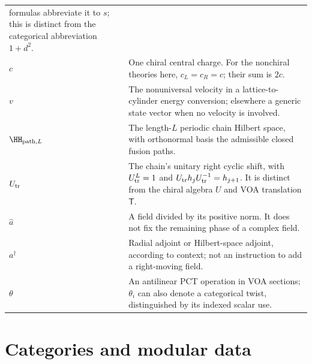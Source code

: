 \begin{longtable}{p{}p{}}
formulas abbreviate it to $s$; this is distinct from the
categorical abbreviation $1+d^2$.\\
$c$&One chiral central charge. For the nonchiral theories here,
$c_L=c_R=c$; their sum is $2c$.\\
$v$&The nonuniversal velocity in a lattice-to-cylinder energy
conversion; elsewhere a generic state vector when no velocity
is involved.\\
$\HH_{\mathrm{path},L}$&The length-$L$ periodic chain Hilbert
space, with orthonormal basis the admissible closed fusion paths.\\
$U_{\rm tr}$&The chain's unitary right cyclic shift, with
$U_{\rm tr}^L=1$ and $U_{\rm tr}h_jU_{\rm tr}^{-1}=h_{j+1}$.
It is distinct from the chiral algebra $U$ and VOA translation
$\mathsf T$.\\
$\widehat a$&A field divided by its positive norm. It does not
fix the remaining phase of a complex field.\\
$a^\dagger$&Radial adjoint or Hilbert-space adjoint, according
to context; not an instruction to add a right-moving field.\\
$\theta$&An antilinear PCT operation in VOA sections;
$\theta_i$ can also denote a categorical twist, distinguished
by its indexed scalar use.\\
\bottomrule
\end{longtable}

\section{Categories and modular data}


